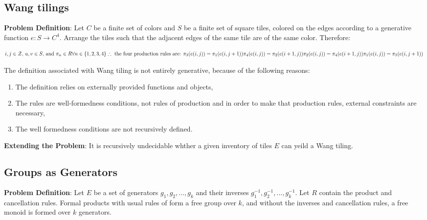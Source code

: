 \documentclass{report}
\begin{document}
\subsection{Wang tilings}

\textbf{Problem Definition}: Let $C$ be a finite set of colors and $S$ be a
finite set of square tiles, colored on the edges according to a generative
function $e : S \rightarrow C^4 $. Arrange the tiles such that the adjacent
edges of the same tile are of the same color. Therefore:

$$
i, j \in \mathcal{Z} \text{, } u, v \in S \text{, and } \pi_n \in R \forall
n \in \{1, 2, 3, 4 \}\\

\therefore \text{ the four production rules are: } \\
\pi_3(e(i, j)) = \pi_1(e(i, j + 1)) \\
\pi_4(e(i, j)) = \pi_2(e(i + 1, j)) \\
\pi_2(e(i, j)) = \pi_4(e(i + 1, j)) \\
\pi_1(e(i, j)) = \pi_3(e(i, j + 1))
$$

 The definition associated with Wang tiling is not entirely
generative, because of the following reasons:
\begin{enumerate}
  \item The definition relies on externally provided functions and objects,
  \item The rules are well-formedness conditions, not rules of production and
        in order to make that production rules, external constraints are
        necessary,
  \item The well formedness conditions are not recursively defined.
\end{enumerate}

\textbf{Extending the Problem}: It is recursively undecidable whther a given
inventory of tiles $E$ can yeild a Wang tiling.

\subsection{Groups as Generators}

\textbf{Problem Definition}: Let $E$ be a set of generators $g_1, g_2, ..., g_k
$ and their inverses $g_1^{-1}, g_2^{-1}, ..., g_k^{-1}$. Let $R$ contain the
product and cancellation rules. Formal products with usual rules of form a free
group over $k$, and without the inverses and cancellation rules, a free monoid
is formed over $k$ generators.
\end{document}
